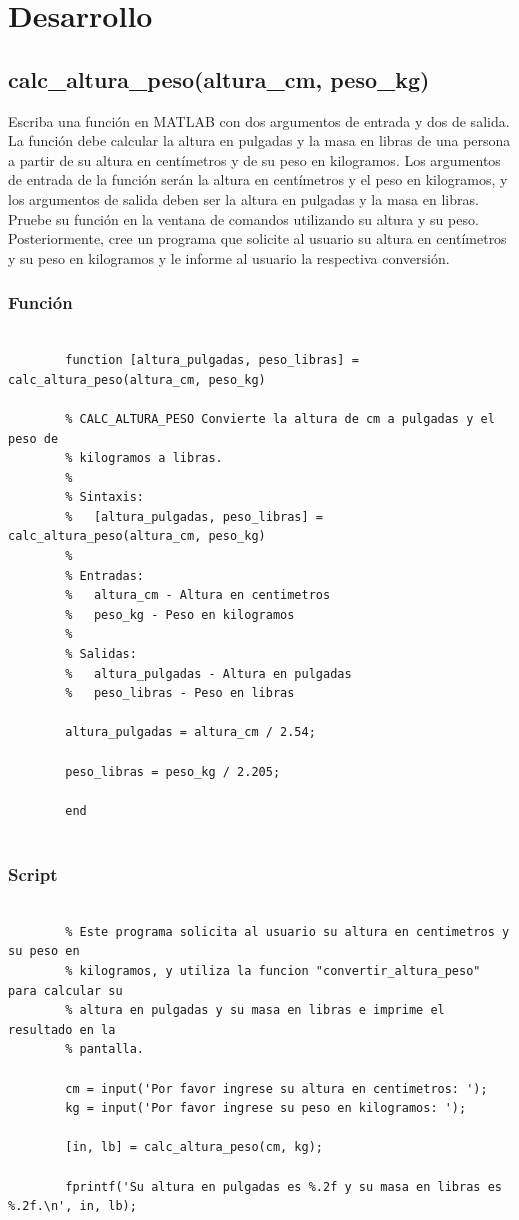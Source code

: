 \documentclass{article}
\begin{document}
	\newpage
	\section{Desarrollo}
	
	\subsection{calc\_altura\_peso(altura\_cm, peso\_kg)}
	
	Escriba una función en MATLAB con dos argumentos de entrada y dos de salida. La función debe calcular la altura en pulgadas y la masa en libras de una persona a partir de su altura en centímetros y de su peso en kilogramos. Los argumentos de entrada de la función serán la altura en centímetros y el peso en kilogramos, y los argumentos de salida deben ser la altura en pulgadas y la masa en libras. Pruebe su función en la ventana de comandos utilizando su altura y su peso. Posteriormente, cree un programa que solicite al usuario su altura en centímetros y su peso en kilogramos y le informe al usuario la respectiva conversión.
	
	\subsubsection{Función}
	
	\begin{lstlisting}
		
		function [altura_pulgadas, peso_libras] = calc_altura_peso(altura_cm, peso_kg)
		
		% CALC_ALTURA_PESO Convierte la altura de cm a pulgadas y el peso de
		% kilogramos a libras.
		%
		% Sintaxis:
		%   [altura_pulgadas, peso_libras] = calc_altura_peso(altura_cm, peso_kg)
		%
		% Entradas:
		%   altura_cm - Altura en centimetros
		%   peso_kg - Peso en kilogramos
		%
		% Salidas:
		%   altura_pulgadas - Altura en pulgadas
		%   peso_libras - Peso en libras
		
		altura_pulgadas = altura_cm / 2.54;
		
		peso_libras = peso_kg / 2.205;
		
		end
		
	\end{lstlisting}
	
	\subsubsection{Script}
	
	\begin{lstlisting}
		
		% Este programa solicita al usuario su altura en centimetros y su peso en
		% kilogramos, y utiliza la funcion "convertir_altura_peso" para calcular su
		% altura en pulgadas y su masa en libras e imprime el resultado en la
		% pantalla.
		
		cm = input('Por favor ingrese su altura en centimetros: ');
		kg = input('Por favor ingrese su peso en kilogramos: ');
		
		[in, lb] = calc_altura_peso(cm, kg);
		
		fprintf('Su altura en pulgadas es %.2f y su masa en libras es %.2f.\n', in, lb);
	\end{lstlisting}
	\newpage
\end{document}
